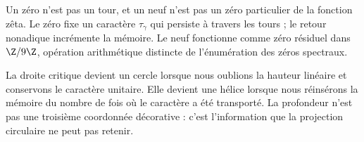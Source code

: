 Un zéro n'est pas un tour, et un neuf n'est pas un zéro particulier de la fonction
zêta. Le zéro fixe un caractère \(\tau_\gamma\) qui persiste à travers les
tours ; le retour nonadique incrémente la mémoire. Le neuf fonctionne comme zéro
résiduel dans \(\Z/9\Z\), opération arithmétique distincte de l'énumération
des zéros spectraux.

\begin{narrativebox}
La droite critique devient un cercle lorsque nous oublions la hauteur linéaire et
conservons le caractère unitaire. Elle devient une hélice lorsque nous réinsérons
la mémoire du nombre de fois où le caractère a été transporté. La profondeur
n'est pas une troisième coordonnée décorative : c'est l'information que la projection
circulaire ne peut pas retenir.
\end{narrativebox}
